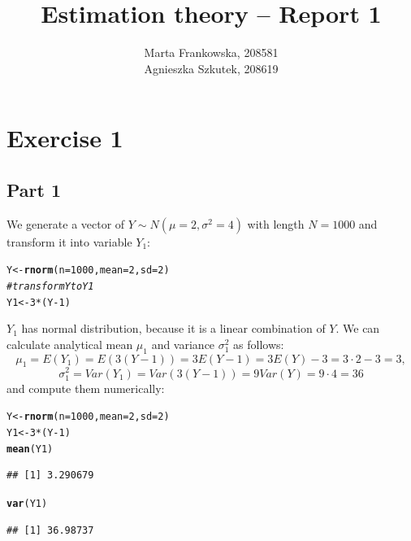 \documentclass[12pt, a4paper]{article}\usepackage[]{graphicx}\usepackage[]{color}
\makeatletter
\newcommand{\hlnum}[1]{\textcolor[rgb]{0.686,0.059,0.569}{#1}}%
\newcommand{\hlcom}[1]{\textcolor[rgb]{0.678,0.584,0.686}{\textit{#1}}}%
\newcommand{\hlopt}[1]{\textcolor[rgb]{0,0,0}{#1}}%
\newcommand{\hlstd}[1]{\textcolor[rgb]{0.345,0.345,0.345}{#1}}%
\newcommand{\hlkwb}[1]{\textcolor[rgb]{0.69,0.353,0.396}{#1}}%
\newcommand{\hlkwc}[1]{\textcolor[rgb]{0.333,0.667,0.333}{#1}}%
\newcommand{\hlkwd}[1]{\textcolor[rgb]{0.737,0.353,0.396}{\textbf{#1}}}%
\newenvironment{kframe}{%
 \def\at@end@of@kframe{}%
 \ifinner\ifhmode%
  \def\at@end@of@kframe{\end{minipage}}%
  \begin{minipage}{\columnwidth}%
 \fi\fi%
 \def\FrameCommand##1{\hskip\@totalleftmargin \hskip-\fboxsep
 \colorbox{shadecolor}{##1}\hskip-\fboxsep
     \hskip-\linewidth \hskip-\@totalleftmargin \hskip\columnwidth}%
 \MakeFramed {\advance\hsize-\width
   \@totalleftmargin\z@ \linewidth\hsize
   \@setminipage}}%
 {\par\unskip\endMakeFramed%
 \at@end@of@kframe}
\newenvironment{knitrout}{}{} %
\makeatother
\begin{document}
\title{Estimation theory -- Report 1}
\author{Marta Frankowska, 208581 \\ Agnieszka Szkutek, 208619}
\maketitle
\tableofcontents 


\section{Exercise 1}

\subsection{Part 1}
We generate a vector of $Y\sim N(\mu=2, \sigma^2=4)$ with length $N = 1000$ and transform it into variable $Y_1$:
\begin{knitrout}
\color{fgcolor}\begin{kframe}
\begin{alltt}
\hlstd{Y} \hlkwb{<-} \hlkwd{rnorm}\hlstd{(}\hlkwc{n} \hlstd{=} \hlnum{1000}\hlstd{,} \hlkwc{mean} \hlstd{=} \hlnum{2}\hlstd{,} \hlkwc{sd} \hlstd{=} \hlnum{2}\hlstd{)}
\hlcom{# transform Y to Y1}
\hlstd{Y1} \hlkwb{<-} \hlnum{3} \hlopt{*} \hlstd{(Y} \hlopt{-} \hlnum{1}\hlstd{)}
\end{alltt}
\end{kframe}
\end{knitrout}
$Y_1$ has normal distribution, because it is a linear combination of $Y$. We can calculate analytical mean $\mu_1$ and variance $\sigma^2_1$ as follows:
\[ \mu_1 = E(Y_1) = E(3 (Y-1)) = 3 E(Y - 1) = 3 E(Y) - 3 = 3 \cdot 2 - 3 = 3,\]
\[ \sigma^2_1 = Var(Y_1) = Var(3 (Y-1)) = 9 Var(Y) = 9 \cdot 4 = 36 \]
and compute them numerically:
\begin{knitrout}
\color{fgcolor}\begin{kframe}
\begin{alltt}
\hlstd{Y} \hlkwb{<-} \hlkwd{rnorm}\hlstd{(}\hlkwc{n} \hlstd{=} \hlnum{1000}\hlstd{,} \hlkwc{mean} \hlstd{=} \hlnum{2}\hlstd{,} \hlkwc{sd} \hlstd{=} \hlnum{2}\hlstd{)}
\hlstd{Y1} \hlkwb{<-} \hlnum{3} \hlopt{*} \hlstd{(Y} \hlopt{-} \hlnum{1}\hlstd{)}
\hlkwd{mean}\hlstd{(Y1)}
\end{alltt}
\begin{verbatim}
## [1] 3.290679
\end{verbatim}
\begin{alltt}
\hlkwd{var}\hlstd{(Y1)}
\end{alltt}
\begin{verbatim}
## [1] 36.98737
\end{verbatim}
\end{kframe}
\end{knitrout}
\end{document}
